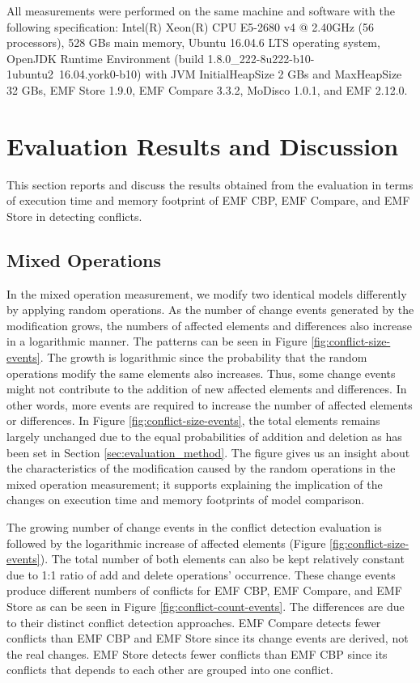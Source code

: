 All measurements were performed on the same machine and software with the following specification: Intel(R) Xeon(R) CPU E5-2680 v4 @ 2.40GHz (56 processors), 528 GBs main memory, Ubuntu 16.04.6 LTS operating system, OpenJDK Runtime Environment (build 1.8.0\_222-8u222-b10-1ubuntu2~16.04.york0-b10) with JVM \textsf{InitialHeapSize} 2 GBs and \textsf{MaxHeapSize} 32 GBs, EMF Store 1.9.0, EMF Compare 3.3.2, MoDisco 1.0.1, and EMF 2.12.0.

\section{Evaluation Results and Discussion}
\label{sec:evaluation_discussion}
This section reports and discuss the results obtained from the evaluation in terms of execution time and memory footprint of EMF CBP, EMF Compare, and EMF Store in detecting conflicts. 

\subsection{Mixed Operations}
\label{sec:mixed-operation_conflict}

In the mixed operation measurement, we modify two identical models differently by applying random operations. As the number of change events generated by the modification grows, the numbers of affected elements and differences also increase in a logarithmic manner. The patterns can be seen in Figure \ref{fig:conflict-size-events}. The growth is logarithmic since the probability that the random operations modify the same elements also increases. Thus, some change events might not contribute to the addition of new affected elements and differences. In other words, more events are required to increase the number of affected elements or differences. In Figure \ref{fig:conflict-size-events}, the total elements remains largely unchanged due to the equal probabilities of addition and deletion as has been set in Section \ref{sec:evaluation_method}. The figure gives us an insight about the characteristics of the modification caused by the random operations in the mixed operation measurement; it supports explaining the implication of the changes on execution time and memory footprints of model comparison.

The growing number of change events in the conflict detection evaluation is followed by the logarithmic increase of affected elements (Figure \ref{fig:conflict-size-events}). The total number of both elements can also be kept relatively constant due to 1:1 ratio of \textsf{add} and \textsf{delete} operations' occurrence. These change events produce different numbers of conflicts for EMF CBP, EMF Compare, and EMF Store as can be seen in Figure \ref{fig:conflict-count-events}. The differences are due to their distinct conflict detection approaches. EMF Compare detects fewer conflicts than EMF CBP and EMF Store since its change events are derived, not the real changes. EMF Store detects fewer conflicts than EMF CBP since its conflicts that depends to each other are grouped into one conflict.

